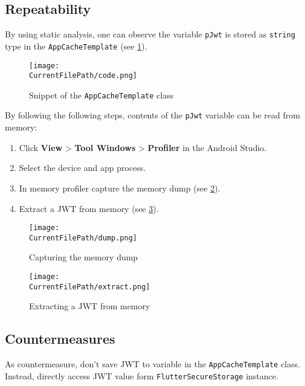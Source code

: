 \subsection*{Repeatability}

By using static analysis, one can observe the variable \texttt{pJwt} is stored as \texttt{string} type in the \texttt{AppCacheTemplate} (see \cref{figure:code}).

\begin{figure}[H]
\centering
\texttt{[image: \\CurrentFilePath/code.png]}
\caption{Snippet of the \texttt{AppCacheTemplate} class}
\label{figure:code}
\end{figure}

By following the following steps, contents of the \texttt{pJwt} variable can be read from memory:

\begin{enumerate}
    \item Click \textbf{View} > \textbf{Tool Windows} > \textbf{Profiler} in the Android Studio.
    \item Select the device and app process.
    \item In memory profiler capture the memory dump (see \cref{figure:dump}).
    \item Extract a JWT from memory (see \cref{figure:extract}).
\end{enumerate}

 \begin{figure}[H]
 \centering
 \texttt{[image: \\CurrentFilePath/dump.png]}
 \caption{Capturing the memory dump}
 \label{figure:dump}
 \end{figure}

 \begin{figure}[H]
 \centering
 \texttt{[image: \\CurrentFilePath/extract.png]}
 \caption{Extracting a JWT from memory}
 \label{figure:extract}
 \end{figure}




\subsection*{Countermeasures}

As countermeasure, don't save JWT to variable in the \texttt{AppCacheTemplate} class.
Instead, directly access JWT value form \texttt{FlutterSecureStorage} instance.

